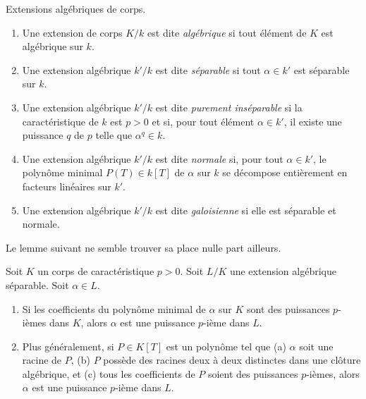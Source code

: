\begin{definition}
\label{definition-separable-algebraic}
Extensions algébriques de corps.
\begin{enumerate}
\item Une extension de corps $K/k$ est dite {\it algébrique}
si tout élément de $K$ est algébrique sur $k$.
\item Une extension algébrique $k'/k$ est dite {\it séparable}
si tout $\alpha \in k'$ est séparable sur $k$.
\item Une extension algébrique
$k'/k$ est dite {\it purement inséparable} si
la caractéristique de $k$ est $p > 0$ et si, pour tout élément
$\alpha \in k'$, il existe une puissance $q$ de $p$ telle que
$\alpha^q \in k$.
\item Une extension algébrique $k'/k$ est dite {\it normale}
si, pour tout $\alpha \in k'$, le polynôme minimal $P(T) \in k[T]$
de $\alpha$ sur $k$ se décompose entièrement en facteurs linéaires sur $k'$.
\item Une extension algébrique $k'/k$ est dite {\it galoisienne}
si elle est séparable et normale.
\end{enumerate}
\end{definition}

\noindent
Le lemme suivant ne semble trouver sa place nulle part ailleurs.

\begin{lemma}
\label{lemma-pth-root}
Soit $K$ un corps de caractéristique $p > 0$. Soit $L/K$ une extension
algébrique séparable. Soit $\alpha \in L$.
\begin{enumerate}
\item Si les coefficients du polynôme minimal de $\alpha$
sur $K$ sont des puissances $p$-ièmes dans $K$, alors $\alpha$ est une puissance
$p$-ième dans $L$.
\item Plus généralement, si $P \in K[T]$ est un polynôme tel que (a) $\alpha$
soit une racine de $P$, (b) $P$ possède des racines deux à deux distinctes dans une clôture algébrique,
et (c) tous les coefficients de $P$ soient des puissances $p$-ièmes, alors $\alpha$ est une
puissance $p$-ième dans $L$.
\end{enumerate}
\end{lemma}

